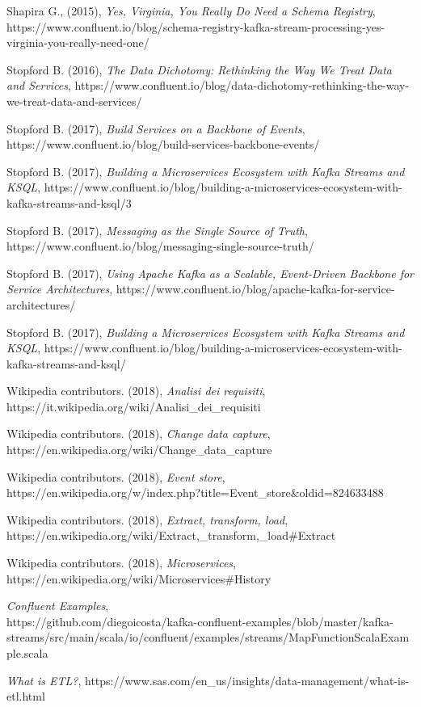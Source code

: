 \documentclass[]{article}
\begin{document}
Shapira G., (2015), \emph{Yes, Virginia, You Really Do Need a Schema
Registry},
https://www.confluent.io/blog/schema-registry-kafka-stream-processing-yes-virginia-you-really-need-one/

Stopford B. (2016), \emph{The Data Dichotomy: Rethinking the Way We
Treat Data and Services},
https://www.confluent.io/blog/data-dichotomy-rethinking-the-way-we-treat-data-and-services/

Stopford B. (2017), \emph{Build Services on a Backbone of Events},\\
https://www.confluent.io/blog/build-services-backbone-events/

Stopford B. (2017), \emph{Building a Microservices Ecosystem with Kafka
Streams and KSQL},
https://www.confluent.io/blog/building-a-microservices-ecosystem-with-kafka-streams-and-ksql/3

Stopford B. (2017), \emph{Messaging as the Single Source of Truth},\\
https://www.confluent.io/blog/messaging-single-source-truth/

Stopford B. (2017), \emph{Using Apache Kafka as a Scalable, Event-Driven
Backbone for Service Architectures},
https://www.confluent.io/blog/apache-kafka-for-service-architectures/

Stopford B. (2017), \emph{Building a Microservices Ecosystem with Kafka
Streams and KSQL},
https://www.confluent.io/blog/building-a-microservices-ecosystem-with-kafka-streams-and-ksql/

Wikipedia contributors. (2018), \emph{Analisi dei requisiti},\\
https://it.wikipedia.org/wiki/Analisi\_dei\_requisiti

Wikipedia contributors. (2018), \emph{Change data capture},\\
https://en.wikipedia.org/wiki/Change\_data\_capture

Wikipedia contributors. (2018), \emph{Event store},\\
https://en.wikipedia.org/w/index.php?title=Event\_store\&oldid=824633488

Wikipedia contributors. (2018), \emph{Extract, transform, load},\\
https://en.wikipedia.org/wiki/Extract,\_transform,\_load\#Extract

Wikipedia contributors. (2018), \emph{Microservices},\\
https://en.wikipedia.org/wiki/Microservices\#History

\emph{Confluent Examples},\\
https://github.com/diegoicosta/kafka-confluent-examples/blob/master/kafka-streams/src/main/scala/io/confluent/examples/streams/MapFunctionScalaExample.scala

\emph{What is ETL?},
https://www.sas.com/en\_us/insights/data-management/what-is-etl.html
\end{document}
